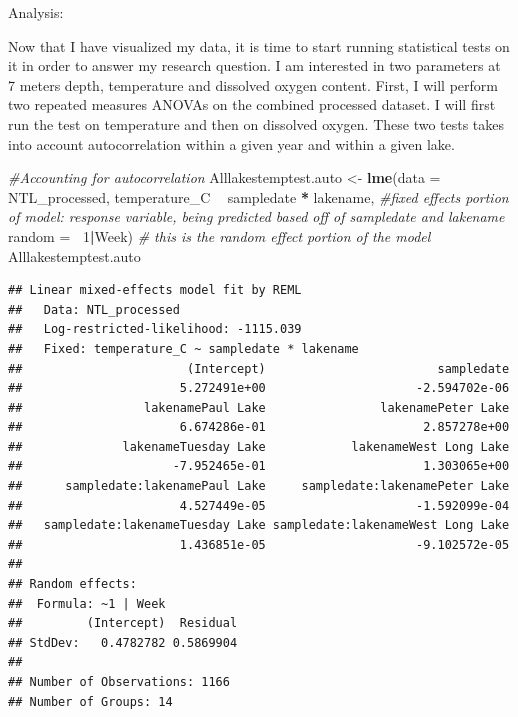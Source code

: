 \documentclass[12pt,]{article}
\newenvironment{Shaded}{\begin{snugshade}}{\end{snugshade}}
\newcommand{\KeywordTok}[1]{\textcolor[rgb]{0.13,0.29,0.53}{\textbf{#1}}}
\newcommand{\DataTypeTok}[1]{\textcolor[rgb]{0.13,0.29,0.53}{#1}}
\newcommand{\DecValTok}[1]{\textcolor[rgb]{0.00,0.00,0.81}{#1}}
\newcommand{\StringTok}[1]{\textcolor[rgb]{0.31,0.60,0.02}{#1}}
\newcommand{\CommentTok}[1]{\textcolor[rgb]{0.56,0.35,0.01}{\textit{#1}}}
\newcommand{\OperatorTok}[1]{\textcolor[rgb]{0.81,0.36,0.00}{\textbf{#1}}}
\newcommand{\NormalTok}[1]{#1}
\begin{document}
Analysis:

Now that I have visualized my data, it is time to start running
statistical tests on it in order to answer my research question. I am
interested in two parameters at 7 meters depth, temperature and
dissolved oxygen content. First, I will perform two repeated measures
ANOVAs on the combined processed dataset. I will first run the test on
temperature and then on dissolved oxygen. These two tests takes into
account autocorrelation within a given year and within a given lake.

\begin{Shaded}
\begin{Highlighting}[]
\CommentTok{#Accounting for autocorrelation}
\NormalTok{Alllakestemptest.auto <-}\StringTok{ }\KeywordTok{lme}\NormalTok{(}\DataTypeTok{data =}\NormalTok{ NTL_processed, }
\NormalTok{                     temperature_C }\OperatorTok{~}\StringTok{ }\NormalTok{sampledate }\OperatorTok{*}\StringTok{ }\NormalTok{lakename, }\CommentTok{#fixed effects portion of model: response variable, being predicted based off of sampledate and lakename}
                     \DataTypeTok{random =} \OperatorTok{~}\DecValTok{1}\OperatorTok{|}\NormalTok{Week)  }\CommentTok{# this is the random effect portion of the model}
\NormalTok{Alllakestemptest.auto}
\end{Highlighting}
\end{Shaded}

\begin{verbatim}
## Linear mixed-effects model fit by REML
##   Data: NTL_processed 
##   Log-restricted-likelihood: -1115.039
##   Fixed: temperature_C ~ sampledate * lakename 
##                       (Intercept)                        sampledate 
##                      5.272491e+00                     -2.594702e-06 
##                 lakenamePaul Lake                lakenamePeter Lake 
##                      6.674286e-01                      2.857278e+00 
##              lakenameTuesday Lake            lakenameWest Long Lake 
##                     -7.952465e-01                      1.303065e+00 
##      sampledate:lakenamePaul Lake     sampledate:lakenamePeter Lake 
##                      4.527449e-05                     -1.592099e-04 
##   sampledate:lakenameTuesday Lake sampledate:lakenameWest Long Lake 
##                      1.436851e-05                     -9.102572e-05 
## 
## Random effects:
##  Formula: ~1 | Week
##         (Intercept)  Residual
## StdDev:   0.4782782 0.5869904
## 
## Number of Observations: 1166
## Number of Groups: 14
\end{verbatim}
\end{document}
